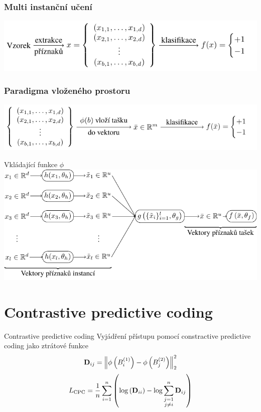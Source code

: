 \documentclass[10pt]{beamer}
\newcommand{\mathmat}{\ensuremath{\mathbf}}
\begin{document}
\begin{frame}[c]\frametitle{Multi instanční učení}
	\centering
	\includegraphics{images/multi_instance_learning/multi_instance_learning.pdf}
\end{frame}

\begin{frame}[c]\frametitle{Paradigma vloženého prostoru}
	\centering
	\includegraphics{images/embedded_space_paradigm/embedded_space_paradigm.pdf}
\end{frame}

\begin{frame}{Vkládající funkce \( \phi \)}
	\centering
	\includegraphics[width=0.9\pagewidth]{images/embedding_function/embedding_function.pdf}
\end{frame}

\section{Contrastive predictive coding}

\begin{frame}{Contrastive predictive coding}
	Vyjádření přístupu pomocí constractive predictive coding jako ztrátové funkce
	\[ \mathmat{D}_{ij} = \left\lVert \phi \left( B_i^{(1)} \right) - \phi \left( B_j^{(2)} \right) \right\rVert_2^2 \]
	\[ L_\mathrm{CPC} = \frac{1}{n} \sum_{i = 1}^n \left( \log \left( \mathmat{D}_{ii} \right) - \log \sum_{\substack{j = 1 \\ j \neq i}}^n \mathmat{D}_{ij} \right) \]
\end{frame}
\end{document}
